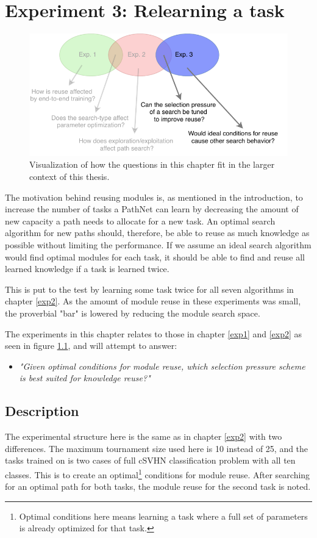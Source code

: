 \chapter{Experiment 3: Relearning a task}
\label{exp3}

\begin{figure}[hb]
    \includegraphics[width=\textwidth]{Chapters/4.Experiments/exp3/figures/exp3.pdf}
    \caption[Experiment focus]{Visualization of how the questions in this chapter fit in the larger context of this thesis.}
    \label{fig:exp3.questions}
\end{figure}
\noindent
The motivation behind reusing modules is, as mentioned in the introduction, to increase the number of tasks a PathNet can learn by decreasing the amount of new capacity a path needs to allocate for a new task. An optimal search algorithm for new paths should, therefore, be able to reuse as much knowledge as possible without limiting the performance. If we assume an ideal search algorithm would find optimal modules for each task, it should be able to find and reuse all learned knowledge if a task is learned twice. 

This is put to the test by learning some task twice for all seven algorithms in chapter \ref{exp2}. As the amount of module reuse in these experiments was small, the proverbial "bar" is lowered by reducing the module search space.

The experiments in this chapter relates to those in chapter \ref{exp1} and \ref{exp2} as seen in figure \ref{fig:exp3.questions}, and will attempt to answer:
\begin{itemize}
    \item \emph{"Given optimal conditions for module reuse, which selection pressure scheme is best suited for knowledge reuse?"}
\end{itemize}


\section{Description}
The experimental structure here is the same as in chapter \ref{exp2} with two differences. The maximum tournament size used here is 10 instead of 25, and the tasks trained on is two cases of full cSVHN classification problem with all ten classes. This is to create an optimal\footnote{Optimal conditions here means learning a task where a full set of parameters is already optimized for that task.} conditions for module reuse. After searching for an optimal path for both tasks, the module reuse for the second task is noted. 

